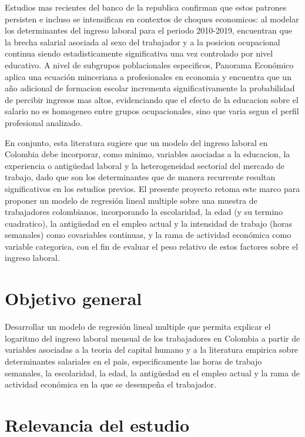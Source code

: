 \documentclass[
  spanish,
  letterpaper,
  DIV=11,
  numbers=noendperiod]{scrartcl}
\begin{document}
Estudios mas recientes del banco de la republica \cite{banrep2021} confirman que
estos patrones persisten e incluso se intensifican en contextos de choques
economicos: al modelar los determinantes del ingreso laboral para el periodo
2010-2019, encuentran que la brecha salarial asociada al sexo del trabajador y a
la posicion ocupacional continua siendo estadisticamente significativa una vez
controlado por nivel educativo. A nivel de subgrupos poblacionales especificos,
Panorama Económico \cite{panorama2019} aplica una ecuación minceriana a
profesionales en economia y encuentra que un año adicional de formacion escolar
incrementa significativamente la probabilidad de percibir ingresos mas altos,
evidenciando que el efecto de la educacion sobre el salario no es homogeneo entre
grupos ocupacionales, sino que varia segun el perfil profesional analizado.

En conjunto, esta literatura sugiere que un modelo del ingreso laboral en Colombia
debe incorporar, como minimo, variables asociadas a la educacion, la experiencia o
antigüedad laboral y la heterogeneidad sectorial del mercado de trabajo, dado que
son los determinantes que de manera recurrente resultan significativos en los
estudios previos. El presente proyecto retoma este marco para proponer un modelo
de regresión lineal multiple sobre una muestra de trabajadores colombianos,
incorporando la escolaridad, la edad (y su termino cuadratico), la antigüedad en
el empleo actual y la intensidad de trabajo (horas semanales) como covariables
continuas, y la rama de actividad económica como variable categorica, con el fin
de evaluar el peso relativo de estos factores sobre el ingreso laboral.

\section{Objetivo general}

Desarrollar un modelo de regresión lineal multiple que permita explicar el
logaritmo del ingreso laboral mensual de los trabajadores en Colombia a partir de
variables asociadas a la teoria del capital humano y a la literatura empirica
sobre determinantes salariales en el pais, especificamente las horas de trabajo
semanales, la escolaridad, la edad, la antigüedad en el empleo actual y la rama
de actividad económica en la que se desempeña el trabajador.

\section{Relevancia del estudio}
\end{document}
